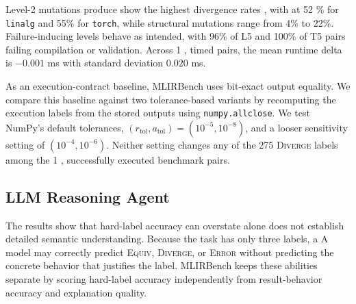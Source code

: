 \documentclass[sigplan,screen,review,anonymous]{acmart}
\providecommand{\DIFadd}[1]{{\protect\color{blue} \sf #1}} %
\providecommand{\DIFdel}[1]{{\protect\color{red} \scriptsize #1}} %
\providecommand{\DIFaddbegin}{} %
\providecommand{\DIFaddend}{} %
\providecommand{\DIFdelbegin}{} %
\providecommand{\DIFdelend}{} %
\begin{document}
Level-2 mutations \DIFdelbegin \DIFdel{produce }\DIFdelend \DIFaddbegin \DIFadd{show }\DIFaddend the highest divergence rates \DIFdelbegin \DIFdel{, with }\DIFdelend \DIFaddbegin \DIFadd{at }\DIFaddend 52%
\DIFaddbegin \DIFadd{\% for
\texttt{linalg} and 55\% for \texttt{torch}, while structural mutations
range from 4\% to 22\%. Failure-inducing levels behave as intended, with
96\% of L5 and 100\% of T5 pairs failing compilation or validation.
Across 1}{\DIFadd{,}}\DIFadd{402 timed pairs, the mean runtime delta is $-0.001$ ms with
standard deviation $0.020$ ms.
}\DIFaddend 

\DIFaddbegin \DIFadd{As an execution-contract baseline, MLIRBench uses bit-exact output equality.
We compare this baseline against two tolerance-based variants by recomputing
the execution labels from the stored outputs using \texttt{numpy.allclose}.
We test NumPy's default tolerances,
$(r_{\mathrm{tol}},a_{\mathrm{tol}})=(10^{-5},10^{-8})$, and a looser
sensitivity setting of $(10^{-4},10^{-6})$. Neither setting changes any of
the 275 \textsc{Diverge} labels among the 1}{\DIFadd{,}}\DIFadd{427 successfully executed
benchmark pairs.
}

\DIFaddend \subsection{LLM Reasoning Agent}

The results show that hard-label accuracy \DIFdelbegin \DIFdel{can overstate }\DIFdelend \DIFaddbegin \DIFadd{alone does not establish
detailed }\DIFaddend semantic understanding. \DIFdelbegin \DIFdel{Because the task has only three labels, a }\DIFdelend \DIFaddbegin \DIFadd{A }\DIFaddend model may correctly predict
\textsc{Equiv}, \textsc{Diverge}, or \textsc{Error} without predicting
the concrete behavior that justifies the label. MLIRBench keeps
these abilities separate by scoring hard-label accuracy independently
from result-behavior accuracy and explanation quality.
\end{document}
